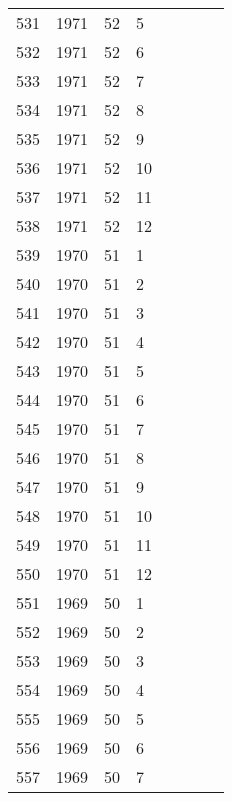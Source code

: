 \begin{longtable}{ |l|l|l|l|l|l|l|l| }
531 & 1971 & 52 &     5 &         &                &  & \\
532 & 1971 & 52 &     6 &         &                &  & \\
533 & 1971 & 52 &     7 &         &                &  & \\
534 & 1971 & 52 &     8 &         &                &  & \\
535 & 1971 & 52 &     9 &         &                &  & \\
536 & 1971 & 52 &    10 &         &                &  & \\
537 & 1971 & 52 &    11 &         &                &  & \\
538 & 1971 & 52 &    12 &         &                &  & \\
539 & 1970 & 51 &     1 &         &                &  & \\
540 & 1970 & 51 &     2 &         &                &  & \\
541 & 1970 & 51 &     3 &         &                &  & \\
542 & 1970 & 51 &     4 &         &                &  & \\
543 & 1970 & 51 &     5 &         &                &  & \\
544 & 1970 & 51 &     6 &         &                &  & \\
545 & 1970 & 51 &     7 &         &                &  & \\
546 & 1970 & 51 &     8 &         &                &  & \\
547 & 1970 & 51 &     9 &         &                &  & \\
548 & 1970 & 51 &    10 &         &                &  & \\
549 & 1970 & 51 &    11 &         &                &  & \\
550 & 1970 & 51 &    12 &         &                &  & \\
551 & 1969 & 50 &     1 &         &                &  & \\
552 & 1969 & 50 &     2 &         &                &  & \\
553 & 1969 & 50 &     3 &         &                &  & \\
554 & 1969 & 50 &     4 &         &                &  & \\
555 & 1969 & 50 &     5 &         &                &  & \\
556 & 1969 & 50 &     6 &         &                &  & \\
557 & 1969 & 50 &     7 &         &                &  & \\

\end{longtable}
